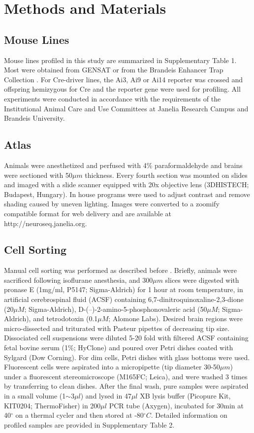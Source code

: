 \section{Methods and Materials}

\subsection{Mouse Lines}
Mouse lines profiled in this study are summarized in Supplementary Table 1. Most were obtained from GENSAT \citep{Gong_2007} or from the Brandeis Enhancer Trap Collection \citep{Shima_2016}. For Cre-driver lines, the Ai3, Ai9 or Ai14 reporter \citep{Madisen_2009} was crossed and offspring hemizygous for Cre and the reporter gene were used for profiling. All experiments were conducted in accordance with the requirements of the Institutional Animal Care and Use Committees at Janelia Research Campus and Brandeis University.

\subsection{Atlas}
Animals were anesthetized and perfused with 4\% paraformaldehyde and brains were sectioned with 50$\mu m$ thickness. Every fourth section was mounted on slides and imaged with a slide scanner equipped with 20x objective lens (3DHISTECH; Budapest, Hungary). In house programs were used to adjust contrast and remove shading caused by uneven lighting. Images were converted to a zoomify compatible format for web delivery and are available at http://neuroseq.janelia.org.

\subsection{Cell Sorting}
Manual cell sorting was performed as described before \citep{Hempel_2007, Sugino_2014}. Briefly, animals were sacrificed following isoflurane anesthesia, and 300$\mu m$ slices were digested with pronase E (1mg/ml, P5147; Sigma-Aldrich) for 1 hour at room temperature, in artificial cerebrospinal fluid (ACSF) containing 6,7-dinitroquinoxaline-2,3-dione (20$\mu M$; Sigma-Aldrich), D-(–)-2-amino-5-phosphonovaleric acid (50$\mu M$; Sigma-Aldrich), and tetrodotoxin (0.1$\mu M$; Alomone Labs). Desired brain regions were micro-dissected and triturated with Pasteur pipettes of decreasing tip size. Dissociated cell suspensions were diluted 5-20 fold with filtered ACSF containing fetal bovine serum (1\%; HyClone) and poured over Petri dishes coated with Sylgard (Dow Corning). For dim cells, Petri dishes with glass bottoms were used. Fluorescent cells were aspirated into a micropipette (tip diameter 30-50$\mu m$) under a fluorescent stereomicroscope (M165FC; Leica), and were washed 3 times by transferring to clean dishes. After the final wash, pure samples were aspirated in a small volume (1$\sim$3$\mu l$) and lysed in 47$\mu l$ XB lysis buffer (Picopure Kit, KIT0204; ThermoFisher) in 200$\mu l$ PCR tube (Axygen), incubated for 30min at 40$^{\circ}$ on a thermal cycler and then stored at -80$^{\circ}C$. Detailed information on profiled samples are provided in Supplementary Table 2.


